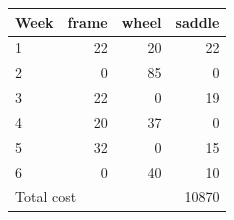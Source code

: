 \begin{tabular}{lrrr}
\hline
Week & frame & wheel & saddle \\
\hline
1 & 22 & 20 & 22 \\
2 & 0 & 85 & 0 \\
3 & 22 & 0 & 19 \\
4 & 20 & 37 & 0 \\
5 & 32 & 0 & 15 \\
6 & 0 & 40 & 10 \\
\hline
\multicolumn{3}{l}{Total cost} & 10870 \\
\hline
\end{tabular}
